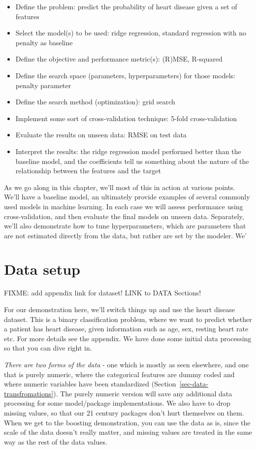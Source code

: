 \documentclass[
  letterpaper,
]{krantz}
\providecommand{\tightlist}{%
  \setlength{\itemsep}{0pt}\setlength{\parskip}{0pt}}\usepackage{longtable,booktabs,array}
\begin{document}
\begin{itemize}
\tightlist
\item
  Define the problem: predict the probability of heart disease given a
  set of features
\item
  Select the model(s) to be used: ridge regression, standard regression
  with no penalty as baseline
\item
  Define the objective and performance metric(s): (R)MSE, R-squared
\item
  Define the search space (parameters, hyperparameters) for those
  models: penalty parameter
\item
  Define the search method (optimization): grid search
\item
  Implement some sort of cross-validation technique: 5-fold
  cross-validation
\item
  Evaluate the results on unseen data: RMSE on test data
\item
  Interpret the results: the ridge regression model performed better
  than the baseline model, and the coefficients tell us something about
  the nature of the relationship between the features and the target
\end{itemize}

As we go along in this chapter, we'll most of this in action at various
points. We'll have a baseline model, an ultimately provide examples of
several commonly used models in machine learning. In each case we will
assess performance using cross-validation, and then evaluate the final
models on unseen data. Separately, we'll also demonstrate how to tune
hyperparameters, which are parameters that are not estimated directly
from the data, but rather are set by the modeler. We'

\section{Data setup}\label{data-setup}

FIXME: add appendix link for dataset! LINK to DATA Sections!

For our demonstration here, we'll switch things up and use the heart
disease dataset. This is a binary classification problem, where we want
to predict whether a patient has heart disease, given information such
as age, sex, resting heart rate etc. For more details see the appendix.
We have done some initial data processing so that you can dive right in.

\emph{There are two forms of the data} - one which is mostly as seen
elsewhere, and one that is purely numeric, where the categorical
features are dummy coded and where numeric variables have been
standardized (Section~\ref{sec-data-transfromations}). The purely
numeric version will save any additional data processing for some
model/package implementations. We also have to drop missing values, so
that our 21 century packages don't hurt themselves on them. When we get
to the boosting demonstration, you can use the data as is, since the
scale of the data doesn't really matter, and missing values are treated
in the same way as the rest of the data values.
\end{document}
